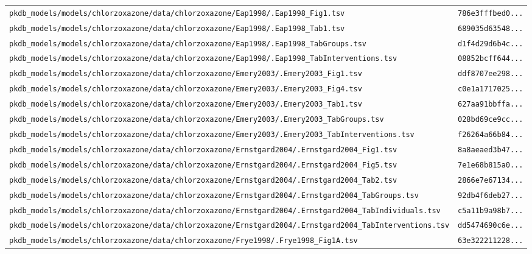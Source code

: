 \documentclass{article}
\begin{document}
\begin{longtable}{ll}
\texttt{pkdb\_models/models/chlorzoxazone/data/chlorzoxazone/Eap1998/.Eap1998\_Fig1.tsv} & \texttt{786e3fffbed0...} \\
\texttt{pkdb\_models/models/chlorzoxazone/data/chlorzoxazone/Eap1998/.Eap1998\_Tab1.tsv} & \texttt{689035d63548...} \\
\texttt{pkdb\_models/models/chlorzoxazone/data/chlorzoxazone/Eap1998/.Eap1998\_TabGroups.tsv} & \texttt{d1f4d29d6b4c...} \\
\texttt{pkdb\_models/models/chlorzoxazone/data/chlorzoxazone/Eap1998/.Eap1998\_TabInterventions.tsv} & \texttt{08852bcff644...} \\
\texttt{pkdb\_models/models/chlorzoxazone/data/chlorzoxazone/Emery2003/.Emery2003\_Fig1.tsv} & \texttt{ddf8707ee298...} \\
\texttt{pkdb\_models/models/chlorzoxazone/data/chlorzoxazone/Emery2003/.Emery2003\_Fig4.tsv} & \texttt{c0e1a1717025...} \\
\texttt{pkdb\_models/models/chlorzoxazone/data/chlorzoxazone/Emery2003/.Emery2003\_Tab1.tsv} & \texttt{627aa91bbffa...} \\
\texttt{pkdb\_models/models/chlorzoxazone/data/chlorzoxazone/Emery2003/.Emery2003\_TabGroups.tsv} & \texttt{028bd69ce9cc...} \\
\texttt{pkdb\_models/models/chlorzoxazone/data/chlorzoxazone/Emery2003/.Emery2003\_TabInterventions.tsv} & \texttt{f26264a66b84...} \\
\texttt{pkdb\_models/models/chlorzoxazone/data/chlorzoxazone/Ernstgard2004/.Ernstgard2004\_Fig1.tsv} & \texttt{8a8aeaed3b47...} \\
\texttt{pkdb\_models/models/chlorzoxazone/data/chlorzoxazone/Ernstgard2004/.Ernstgard2004\_Fig5.tsv} & \texttt{7e1e68b815a0...} \\
\texttt{pkdb\_models/models/chlorzoxazone/data/chlorzoxazone/Ernstgard2004/.Ernstgard2004\_Tab2.tsv} & \texttt{2866e7e67134...} \\
\texttt{pkdb\_models/models/chlorzoxazone/data/chlorzoxazone/Ernstgard2004/.Ernstgard2004\_TabGroups.tsv} & \texttt{92db4f6deb27...} \\
\texttt{pkdb\_models/models/chlorzoxazone/data/chlorzoxazone/Ernstgard2004/.Ernstgard2004\_TabIndividuals.tsv} & \texttt{c5a11b9a98b7...} \\
\texttt{pkdb\_models/models/chlorzoxazone/data/chlorzoxazone/Ernstgard2004/.Ernstgard2004\_TabInterventions.tsv} & \texttt{dd5474690c6e...} \\
\texttt{pkdb\_models/models/chlorzoxazone/data/chlorzoxazone/Frye1998/.Frye1998\_Fig1A.tsv} & \texttt{63e322211228...} \\

\end{longtable}
\end{document}

